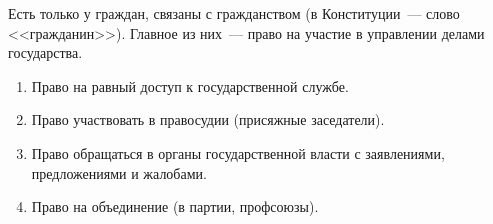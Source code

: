 \documentclass[12pt]{article}
\begin{document}
	Есть только у граждан, связаны с гражданством (в Конституции~--- слово <<гражданин>>). Главное из них~--- право на участие в управлении делами государства.
	
	\begin{enumerate}
		\item Право на равный доступ к государственной службе.
		\item Право участвовать в правосудии (присяжные заседатели).
		\item Право обращаться в органы государственной власти с заявлениями, предложениями и жалобами.
		\item Право на объединение (в партии, профсоюзы).
	\end{enumerate}
\end{document}
